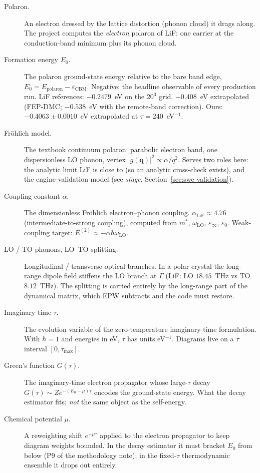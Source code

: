 \documentclass[11pt]{article}
\newcommand{\qv}{\mathbf{q}}
\newcommand{\term}[1]{\item[#1.]}
\begin{document}
\begin{description}
\term{Polaron} An electron dressed by the lattice distortion (phonon cloud) it drags
  along. The project computes the \emph{electron} polaron of LiF: one carrier at the
  conduction-band minimum plus its phonon cloud.

\term{Formation energy $E_{0}$} The polaron ground-state energy relative to the bare
  band edge, $E_{0}=E_{\mathrm{polaron}}-\varepsilon_{\mathrm{CBM}}$. Negative;
  the headline observable of every production run. LiF references:
  $-0.2479$~eV on the $20^{3}$ grid, $-0.408$~eV extrapolated (FEP-DMC; $-0.538$~eV with the remote-band correction). Ours: $-0.4063\pm0.0010$~eV extrapolated at $\tau=240$~eV$^{-1}$.

\term{Fr\"ohlich model} The textbook continuum polaron: parabolic electron band, one
  dispersionless LO phonon, vertex $|g(\qv)|^{2}\propto\alpha/q^{2}$. Serves two roles
  here: the analytic limit LiF is close to (so an analytic cross-check exists), and the
  engine-validation model (see \emph{stage}, Section~\ref{sec:swe-validation}).

\term{Coupling constant $\alpha$} The dimensionless Fr\"ohlich electron--phonon
  coupling. $\alpha_{\mathrm{LiF}}\approx4.76$ (intermediate-to-strong coupling),
  computed from $m^{*}$, $\omega_{\mathrm{LO}}$, $\varepsilon_{\infty}$,
  $\varepsilon_{0}$. Weak-coupling target: $E^{(2)}\approx-\alpha\hbar\omega_{\mathrm{LO}}$.

\term{LO / TO phonons, LO--TO splitting} Longitudinal / transverse optical branches. In
  a polar crystal the long-range dipole field stiffens the LO branch at $\Gamma$
  (LiF: LO $18.45$~THz vs TO $8.12$~THz). The splitting is carried entirely by the
  long-range part of the dynamical matrix, which EPW subtracts and the code must restore.

\term{Imaginary time $\tau$} The evolution variable of the zero-temperature
  imaginary-time formulation. With $\hbar=1$ and energies in eV, $\tau$ has units
  eV$^{-1}$. Diagrams live on a $\tau$ interval $[0,\tau_{\max}]$.

\term{Green's function $G(\tau)$} The imaginary-time electron propagator whose
  large-$\tau$ decay $G(\tau)\sim Z e^{-(E_{0}-\mu)\tau}$ encodes the ground-state
  energy. What the decay estimator fits; \emph{not} the same object as the self-energy.

\term{Chemical potential $\mu$} A reweighting shift $e^{+\mu\tau}$ applied to the
  electron propagator to keep diagram weights bounded. In the decay estimator it must
  bracket $E_{0}$ from below (P9 of the methodology note); in the fixed-$\tau$
  thermodynamic ensemble it drops out entirely.


\end{description}
\end{document}
